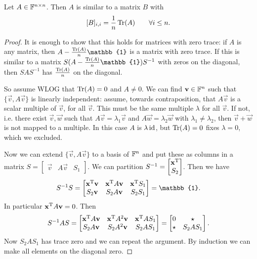 \begin{lemma} \label{lemma:averageTraceOverDiagonal}
Let $A\in\mathbb{F}^{n\times n}$. Then $A$ is similar to a matrix $B$ with
\[ [B]_{i,i} = \frac{1}{n}\operatorname{Tr}(A) \qquad \forall i\leq n. \]
\end{lemma}
\begin{proof}
It is enough to show that this holds for matrices with zero trace: if $A$ is any matrix, then $A- \frac{\Tr(A)}{n}\mathbb{1}$ is a matrix with zero trace. If this is similar to a matrix $S(A- \frac{\Tr(A)}{n}\mathbb{1})S^{-1}$ with zeros on the diagonal, then $SAS^{-1}$ has $\frac{\operatorname{Tr}(A)}{n}$ on the diagonal.

So assume WLOG that $\operatorname{Tr}(A) = 0$ and $A\neq 0$. We can find $\bm{\mathrm{v}}\in\mathbb{F}^n$ such that $\{\vec{v}, A\vec{v}\}$ is linearly independent: assume, towards contraposition, that $A\vec{v}$ is a scalar multiple of $\vec{v}$, for all $\vec{v}$. This must be the same multiple $\lambda$ for all $\vec{v}$. If not, i.e. there exist $\vec{v},\vec{w}$ such that $A\vec{v} = \lambda_1 \vec{v}$ and $A\vec{w} = \lambda_2 \vec{w}$ with $\lambda_1\neq \lambda_2$, then $\vec{v}+\vec{w}$ is not mapped to a multiple. In this case $A$ is $\lambda \operatorname{id}$, but $\operatorname{Tr}(A) = 0$ fixes $\lambda=0$, which we excluded.

Now we can extend $\{\vec{v}, A\vec{v}\}$ to a basis of $\mathbb{F}^n$ and put these as columns in a matrix $S = \begin{bmatrix}
\vec{v} & A\vec{v} & S_1
\end{bmatrix}$. We can partition $S^{-1} = \begin{bmatrix}
\bm{\mathrm{x}}^{\mathrm{T}} \\ S_2
\end{bmatrix}$. Then we have
\[ S^{-1}S = \begin{bmatrix}
\vec{x}^\transp \vec{v} & \vec{x}^\transp A\vec{v} & \vec{x}^\transp S_1 \\ S_2\vec{v} & S_2A\vec{v} & S_2S_1
\end{bmatrix} = \mathbb{1}. \]
In particular $\bm{\mathrm{x}}^{\mathrm{T}} A\bm{\mathrm{v}} = 0$. Then
\[ S^{-1}AS = \begin{bmatrix}
\bm{\mathrm{x}}^{\mathrm{T}} A\bm{\mathrm{v}} & \bm{\mathrm{x}}^{\mathrm{T}} A^2\bm{\mathrm{v}} & \bm{\mathrm{x}}^{\mathrm{T}} A S_1 \\
S_2A\bm{\mathrm{v}} & S_2A^2\bm{\mathrm{v}} & S_2AS_1
\end{bmatrix}  = \begin{bmatrix}
0 & \star \\ \star & S_2AS_1
\end{bmatrix}. \]
Now $S_2AS_1$ has trace zero and we can repeat the argument. By induction we can make all elements on the diagonal zero.
\end{proof}




